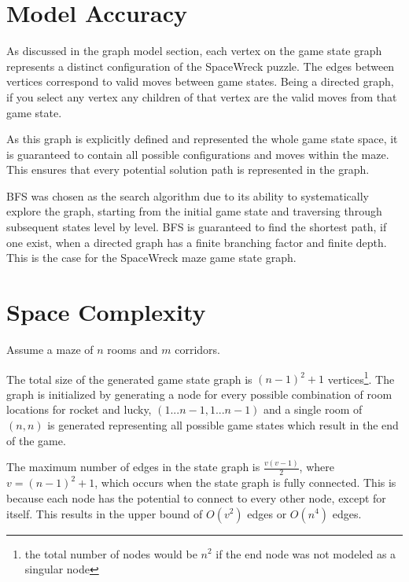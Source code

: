 \documentclass[12pt]{exam}
\begin{document}
\section*{Model Accuracy}

As discussed in the graph model section, each vertex on the game state graph represents a distinct configuration of the SpaceWreck puzzle. The edges between vertices correspond to valid moves between game states. Being a directed graph, if you select any vertex any children of that vertex are the valid moves from that game state.

As this graph is explicitly defined and represented the whole game state space, it is guaranteed to contain all possible configurations and moves within the maze. This ensures that every potential solution path is represented in the graph.

BFS was chosen as the search algorithm due to its ability to systematically explore the graph, starting from the initial game state and traversing through subsequent states level by level. BFS is guaranteed to find the shortest path, if one exist, when a directed graph has a finite branching factor and finite depth. This is the case for the SpaceWreck maze game state graph.


\section*{Space Complexity}
Assume a maze of $n$ rooms and $m$ corridors.

The total size of the generated game state graph is $(n-1)^2 + 1$ vertices\footnote{the total number of nodes would be $n^2$ if the end node was not modeled as a singular node}. The graph is initialized by generating a node for every possible combination of room locations for rocket and lucky, $(1...n-1,1...n-1)$ and a single room of $(n,n)$ is generated representing all possible game states which result in the end of the game.

The maximum number of edges in the state graph is $\frac{v(v-1)}{2}$, where $v=(n-1)^2 + 1$, which occurs when the state graph is fully connected. This is because each node has the potential to connect to every other node, except for itself. This results in the upper bound of $O(v^2)$ edges or $O(n^4)$ edges.


\pagebreak
\end{document}

